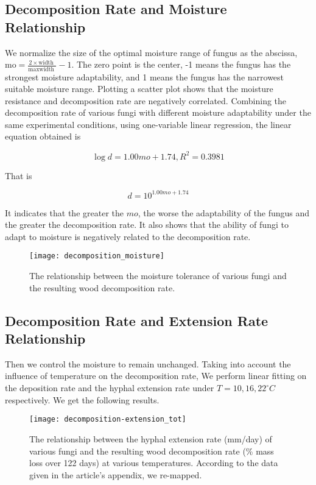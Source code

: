\documentclass{mcmthesis}
\begin{document}
\subsection{Decomposition Rate and Moisture Relationship}

We normalize the size of the optimal moisture range of fungus as the abscissa, $ \text {mo}=\frac{2 \times \text {width }}{\text {maxwidth }}-1 $. The zero point is the center, -1 means the fungus has the strongest moisture adaptability, and 1 means the fungus has the narrowest suitable moisture range. Plotting a scatter plot shows that the moisture resistance and decomposition rate are negatively correlated. Combining the decomposition rate of various fungi with different moisture adaptability under the same experimental conditions, using one-variable linear regression, the linear equation obtained is 

\begin{equation}
  \log {d}=1.00mo+1.74,R^2=0.3981
\end{equation}

That is

\begin{equation}
  {d}=10 ^{1.00mo+1.74}
\end{equation}

It indicates that the greater the $mo $, the worse the adaptability of the fungus and the greater the decomposition rate. It also shows that the ability of fungi to adapt to moisture is negatively related to the decomposition rate. 

\begin{figure}[H]
  \small
  \centering
  \texttt{[image: decomposition\_moisture]}
  \caption{The relationship between the moisture tolerance of various fungi and the resulting wood decomposition rate.}
  \label{decomposition_moisture}
\end{figure}

\subsection{Decomposition Rate and Extension Rate Relationship}

Then we control the moisture to remain unchanged. Taking into account the influence of temperature on the decomposition rate,  We perform linear fitting on the deposition rate and the hyphal extension rate under $ T=10, 16, 22^{\circ}C $ respectively. We get the following results. 

\begin{figure}[H]
  \small
  \centering
  \texttt{[image: decomposition-extension\_tot]}
  \caption{The relationship between the hyphal extension rate (mm/day) of various fungi and the resulting wood decomposition rate (\% mass loss over 122 days) at various temperatures. \cite{lustenhouwer2020trait} According to the data given in the article's appendix, we re-mapped.}
  \label{decomposition-extension_tot}
\end{figure}
\end{document}

